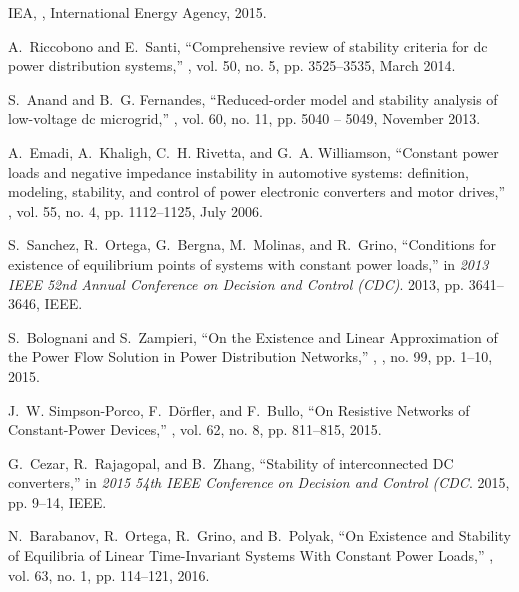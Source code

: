 \documentclass[letterpaper, 10 pt, conference]{ieeeconf}
\begin{document}
\begin{thebibliography}{10}

IEA,
,
\newblock International Energy Agency, 2015.

A.~Riccobono and E.~Santi,
\newblock ``Comprehensive review of stability criteria for dc power
  distribution systems,''
, vol. 50, no. 5,
  pp. 3525--3535, March 2014.

S.~Anand and B.~G. Fernandes,
\newblock ``Reduced-order model and stability analysis of low-voltage dc
  microgrid,''
, vol. 60, no. 11,
  pp. 5040 -- 5049, November 2013.

A.~Emadi, A.~Khaligh, C.~H. Rivetta, and G.~A. Williamson,
\newblock ``Constant power loads and negative impedance instability in
  automotive systems: definition, modeling, stability, and control of power
  electronic converters and motor drives,''
, vol. 55, no. 4, pp.
  1112--1125, July 2006.

S.~Sanchez, R.~Ortega, G.~Bergna, M.~Molinas, and R.~Grino,
\newblock ``{Conditions for existence of equilibrium points of systems with
  constant power loads},''
\newblock in {\em 2013 IEEE 52nd Annual Conference on Decision and Control
  (CDC)}. 2013, pp. 3641--3646, IEEE.

S.~Bolognani and S.~Zampieri,
\newblock ``{On the Existence and Linear Approximation of the Power Flow
  Solution in Power Distribution Networks},''
, , no. 99, pp. 1--10, 2015.

J.~W. Simpson-Porco, F.~D{\"o}rfler, and F.~Bullo,
\newblock ``{On Resistive Networks of Constant-Power Devices},''
,
  vol. 62, no. 8, pp. 811--815, 2015.

G.~Cezar, R.~Rajagopal, and B.~Zhang,
\newblock ``{Stability of interconnected DC converters},''
\newblock in {\em 2015 54th IEEE Conference on Decision and Control (CDC}.
  2015, pp. 9--14, IEEE.

N.~Barabanov, R.~Ortega, R.~Grino, and B.~Polyak,
\newblock ``{On Existence and Stability of Equilibria of Linear Time-Invariant
  Systems With Constant Power Loads},''
,
  vol. 63, no. 1, pp. 114--121, 2016.


\end{thebibliography}
\end{document}
